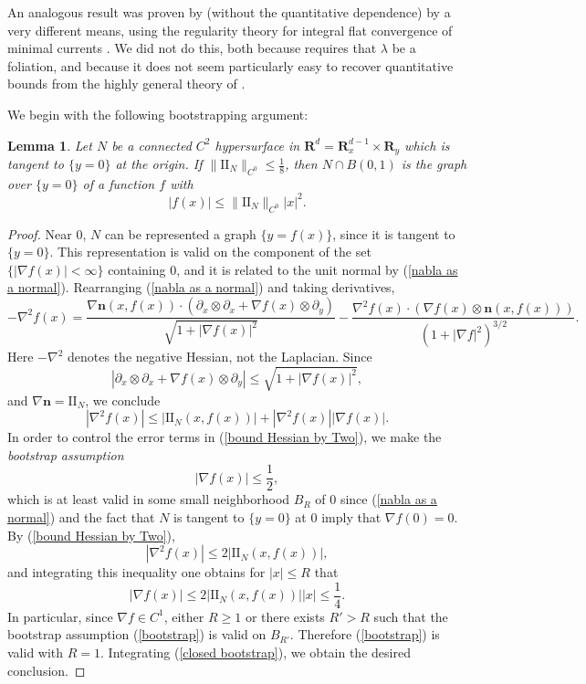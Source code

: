 \documentclass[reqno,11pt]{amsart}
\newcommand{\RR}{\mathbf{R}}
\newcommand{\Two}{\mathrm{I\!I}}
\newcommand{\normal}{\mathbf n}
\newcommand{\dfn}[1]{\emph{#1}\index{#1}}
\newtheorem{lemma}[theorem]{Lemma}
\theoremstyle{definition}
\numberwithin{equation}{section}
\begin{document}
An analogous result was proven by \cite{Solomon86} (without the quantitative dependence) by a very different means, using the regularity theory for integral flat convergence of minimal currents \cite[Theorem 5.3.14]{federer2014geometric}.
We did not do this, both because \cite{Solomon86} requires that $\lambda$ be a foliation, and because it does not seem particularly easy to recover quantitative bounds from the highly general theory of \cite[Chapter 5]{federer2014geometric}.

We begin with the following bootstrapping argument:

\begin{lemma}\label{existence of tubes}
	Let $N$ be a connected $C^2$ hypersurface in $\RR^d = \RR^{d - 1}_x \times \RR_y$ which is tangent to $\{y = 0\}$ at the origin.
	If $\|\Two_N\|_{C^0} \leq \frac{1}{8}$, then $N \cap B(0, 1)$ is the graph over $\{y = 0\}$ of a function $f$ with
	$$|f(x)| \leq \|\Two_N\|_{C^0} |x|^2.$$
\end{lemma}
\begin{proof}
	Near $0$, $N$ can be represented a graph $\{y = f(x)\}$, since it is tangent to $\{y = 0\}$.
	This representation is valid on the component of the set $\{|\nabla f(x)| < \infty\}$ containing $0$, and it is related to the unit normal by (\ref{nabla as a normal}).
	Rearranging (\ref{nabla as a normal}) and taking derivatives,
	$$-\nabla^2 f(x) = \frac{\nabla \normal(x, f(x)) \cdot (\partial_x \otimes \partial_x + \nabla f(x) \otimes \partial_y)}{\sqrt{1 + |\nabla f(x)|^2}} - \frac{\nabla^2 f(x) \cdot (\nabla f(x) \otimes \normal(x, f(x)))}{(1 + |\nabla f|^2)^{3/2}}.$$
	Here $-\nabla^2$ denotes the negative Hessian, not the Laplacian.
	Since
	$$|\partial_x \otimes \partial_x + \nabla f(x) \otimes \partial_y| \leq \sqrt{1 + |\nabla f(x)|^2},$$
	and $\nabla \normal = \Two_N$, we conclude
\begin{equation}\label{bound Hessian by Two}
	|\nabla^2 f(x)| \leq |\Two_N(x, f(x))| + |\nabla^2 f(x)| |\nabla f(x)|.
\end{equation}
	In order to control the error terms in (\ref{bound Hessian by Two}), we make the \dfn{bootstrap assumption}
\begin{equation}\label{bootstrap}
	|\nabla f(x)| \leq \frac{1}{2},
\end{equation}
	which is at least valid in some small neighborhood $B_R$ of $0$ since (\ref{nabla as a normal}) and the fact that $N$ is tangent to $\{y = 0\}$ at $0$ imply that $\nabla f(0) = 0$.
	By (\ref{bound Hessian by Two}),
$$|\nabla^2 f(x)| \leq 2|\Two_N(x, f(x))|,$$
	and integrating this inequality one obtains for $|x| \leq R$ that
\begin{equation}\label{closed bootstrap}
	|\nabla f(x)| \leq 2|\Two_N(x, f(x))| |x| \leq \frac{1}{4}.
\end{equation}
	In particular, since $\nabla f \in C^1$, either $R \geq 1$ or there exists $R' > R$ such that the bootstrap assumption (\ref{bootstrap}) is valid on $B_{R'}$.
	Therefore (\ref{bootstrap}) is valid with $R = 1$.
	Integrating (\ref{closed bootstrap}), we obtain the desired conclusion.
\end{proof}
\end{document}
